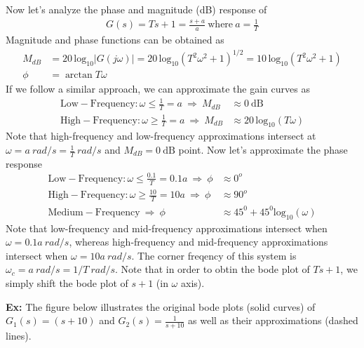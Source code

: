 \documentclass[twoside]{article}
\begin{document}
\vspace{6 pt}

Now let's analyze the phase and magnitude (dB) response of 
%
\begin{align*}
  G(s) = T s + 1 = \frac{s + a}{a} \ \mathrm{where} \ a = \frac{1}{T}
\end{align*}
%
Magnitude and phase functions can be obtained as
\begin{align*}
  M_{dB}  &= 20 \, \mathrm{log}_{10} | G( j \omega) | = 20 \, \mathrm{log}_{10} \left( T^2 \omega^2 + 1 \right)^{1/2} = 10 \, \mathrm{log}_{10} \left( T^2 \omega^2 + 1 \right)
  \\
  \phi &= \arctan T \omega                                    
\end{align*}
%
If we follow a similar approach, we can approximate the gain curves as
%
\begin{align*}
  \mathrm{Low-Frequency}: \omega \leq \frac{1}{T} = a  \ \Rightarrow \ M_{dB}  &\approx 0 \ \mathrm{dB} \\
  \mathrm{High-Frequency}: \omega \geq \frac{1}{T} = a \ \Rightarrow \ M_{dB}  &\approx 20 \, \mathrm{log}_{10} ( T \omega )
\end{align*}
%
Note that high-frequency and low-frequency approximations intersect at
$\omega = a \ rad/s = \frac{1}{T} \ rad/s$ and $M_{dB} = 0 \ \mathrm{dB}$ point. Now 
let's approximate the phase response
%
\begin{align*}
  \mathrm{Low-Frequency}: \omega \leq \frac{0.1}{T} = 0.1 a \ \Rightarrow \ \phi  &\approx 0^o  \\
  \mathrm{High-Frequency}: \omega \geq \frac{10}{T} = 10 a  \ \Rightarrow \ \phi &\approx 90^o \\
  \mathrm{Medium-Frequency} \ \Rightarrow \ \phi & \approx 45^0 + 45^0 \mathrm{log}_{10} ( \omega)
\end{align*}
%
Note that low-frequency and mid-frequency approximations intersect
when $\omega = 0.1 a \ rad/s$,
whereas high-frequency and mid-frequency approximations intersect when
$\omega = 10 a \ rad/s$.
The corner freqency of this system is $\omega_c = a \ rad/s = 1/T \
rad/s$. Note that in order to obtin the bode plot of $T s + 1$, we
simply shift the bode plot of $s + 1$ (in $\omega$ axis). 

\vspace{6pt}

\textbf{Ex:} The figure below
illustrates the original bode plots (solid curves) of $G_1(s) = (s+10)$ and $G_2(s) = \frac{1}{s+10}$ as well as
their approximations (dashed lines). 
\end{document}
